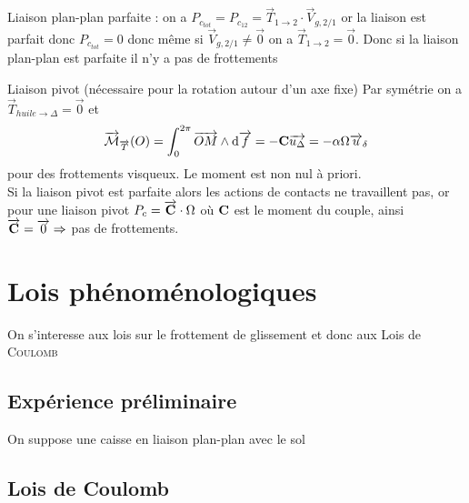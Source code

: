 \documentclass[a4paper,french,bookmarks]{book}
\begin{document}
        \begin{enumerate}
            \itt Liaison plan-plan parfaite : on a \( P_{c_{tot}} = P_{c_{12}} = \vec T_{1\to 2} \cdot \vec V_{g,2/1}\) or la liaison est parfait donc \(P_{c_{tot}} = 0\) donc même si \(\vec V_{g,2/1} \neq \vec 0\) on a \(\vec T_{1\to 2} = \vec 0\). Donc si la liaison plan-plan est parfaite il n'y a pas de frottements
    
            \itt Liaison pivot (nécessaire pour la rotation autour d'un axe fixe) %
            Par symétrie on a \(\vec T_{huile \to\Delta} = \vec 0\) et \[\overrightarrow{\mathcal{M}}_{\overrightarrow{T}}(O) = \int_0^{2\pi} \overrightarrow{OM} \wedge \mathrm d \overrightarrow{f} = -\mathbf{C} \overrightarrow{u_{\Delta}} = - \alpha \Omega\overrightarrow{u}_{\delta}\] pour des frottements visqueux. Le moment est non nul à priori. \\ Si la liaison pivot est parfaite alors les actions de contacts ne travaillent pas, or pour une liaison pivot \(P_{c} = \overrightarrow{\mathbf{C}}\cdot \Omega\) où \(\mathbf{C}\) est le moment du couple, ainsi \(\overrightarrow{\mathbf{C}} = \overrightarrow{0} \Rightarrow\) pas de frottements.
        \end{enumerate}

    \section{Lois phénoménologiques}

    On s'interesse aux lois sur le frottement de glissement %
    et donc aux Lois de \textsc{Coulomb} %

    \subsection{Expérience préliminaire}
        On suppose une caisse en liaison plan-plan avec le sol %
    
        \begin{center} %
        \end{center}

    \subsection{Lois de Coulomb}
\end{document}
